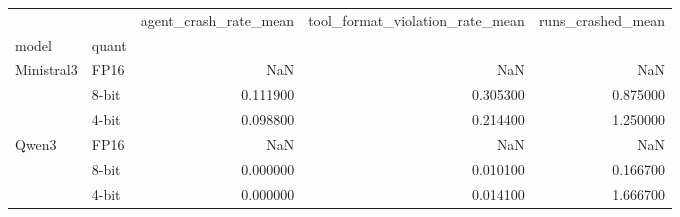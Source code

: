 \begin{tabular}{llrrr}
\toprule
 &  & agent_crash_rate_mean & tool_format_violation_rate_mean & runs_crashed_mean \\
model & quant &  &  &  \\
\midrule
\multirow[t]{3}{*}{Ministral3} & FP16 & NaN & NaN & NaN \\
 & 8-bit & 0.111900 & 0.305300 & 0.875000 \\
 & 4-bit & 0.098800 & 0.214400 & 1.250000 \\
\cline{1-5}
\multirow[t]{3}{*}{Qwen3} & FP16 & NaN & NaN & NaN \\
 & 8-bit & 0.000000 & 0.010100 & 0.166700 \\
 & 4-bit & 0.000000 & 0.014100 & 1.666700 \\
\cline{1-5}
\bottomrule
\end{tabular}
